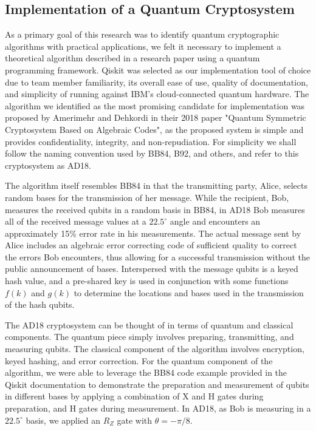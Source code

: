 \documentclass[sigconf]{acmart}
\begin{document}
\subsection{Implementation of a Quantum Cryptosystem}
As a primary goal of this research was to identify quantum cryptographic algorithms with practical applications, we felt it necessary to implement a theoretical algorithm described in a research paper using a quantum programming framework. %
Qiskit was selected as our implementation tool of choice due to team member familiarity, its overall ease of use, quality of documentation, and simplicity of running against IBM's cloud-connected quantum hardware. The algorithm we identified as the most promising candidate for implementation was proposed by Amerimehr and Dehkordi in their 2018 paper "Quantum Symmetric Cryptosystem Based on Algebraic Codes"\cite{amerimehr_quantum_2018}, as the proposed system is simple and provides confidentiality, integrity, and non-repudiation. For simplicity we shall follow the naming convention used by BB84, B92, and others, and refer to this cryptosystem as AD18. %

The algorithm itself resembles BB84 in that the transmitting party, Alice, selects random bases for the transmission of her message. While the recipient, Bob, measures the received qubits in a random basis in BB84, in AD18 Bob measures all of the received message values at a $22.5^{\circ}$ angle and encounters an approximately 15\% error rate in his measurements. The actual message sent by Alice includes an algebraic error correcting code of sufficient quality to correct the errors Bob encounters, thus allowing for a successful transmission without the public announcement of bases. Interspersed with the message qubits is a keyed hash value, and a pre-shared key is used in conjunction with some functions $f(k)$ and $g(k)$ to determine the locations and bases used in the transmission of the hash qubits. %

The AD18 cryptosystem can be thought of in terms of quantum and classical components. The quantum piece simply involves preparing, transmitting, and measuring qubits. The classical component of the algorithm involves encryption, keyed hashing, and error correction. For the quantum component of the algorithm, we were able to leverage the BB84 code example provided in the Qiskit documentation\cite{noauthor_quantum_nodate} to demonstrate the preparation and measurement of qubits in different bases by applying a combination of X and H gates during preparation, and H gates during measurement. %
In AD18, as Bob is measuring in a $22.5^{\circ}$ basis, we applied an $R_Z$ gate with $\theta = -\pi/8$.
\end{document}
